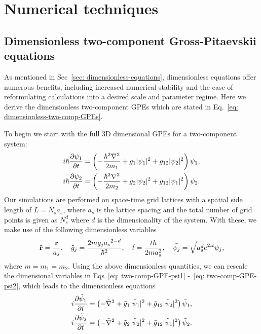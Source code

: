 \chapter{Numerical techniques}

\section{Dimensionless two-component Gross-Pitaevskii equations}
As mentioned in Sec~\ref{sec: dimensionless-equations}, dimensionless equations
offer numerous benefits, including increased numerical stability and the ease
of reformulating calculations into a desired scale and parameter regime.
Here we derive the dimensionless two-component GPEs which are stated in
Eq.~\eqref{eq: dimensionless-two-comp-GPEs}.

To begin we start with the full 3D dimensional GPEs for a two-component system:
\begin{align} \label{eq: two-comp-GPE-psi1}
    i\hbar\pdv{\psi_1}{t} &= \left(-\frac{\hbar^2\nabla^2}{2m_1} + g_1|\psi_1|^2
    +g_{12}|\psi_2|^2\right)\psi_1, \\
    i\hbar\pdv{\psi_2}{t} &= \left(-\frac{\hbar^2\nabla^2}{2m_2} + g_2|\psi_2|^2
    +g_{12}|\psi_1|^2\right)\psi_2. \label{eq: two-comp-GPE-psi2}
\end{align}
Our simulations are performed on space-time grid lattices with a spatial side
length of \(L = N_s a_s\), where \(a_s\) is the lattice spacing and the total
number of grid points is given as \(N_s^d\) where \(d\) is the dimensionality of
the system.
With these, we make use of the following dimensionless variables
\begin{align}
    \tilde{\vb{r}} = \frac{\vb{r}}{a_s}, \quad
    \tilde{g}_j = \frac{2mg_j{a_s}^{2-d}}{\hbar^2}, \quad
    \tilde{t} = \frac{t\hbar}{2ma_s^2}, \quad
    \tilde{\psi_j} = \sqrt{a_s^d}e^{2i\tilde{t}}\psi_j,
\end{align}
where \(m = m_1 = m_2\).
Using the above dimensionless quantities, we can rescale the dimensional
variables in Eqs~\eqref{eq: two-comp-GPE-psi1} -~\eqref{eq: two-comp-GPE-psi2},
which leads to the dimensionless equations
\begin{align}
    i\pdv{\tilde{\psi}_1}{t} &= \left(-\tilde{\nabla}^2
    + \tilde{g}_1|\tilde{\psi}_1|^2 + \tilde{g}_{12}|\tilde{\psi}_2|^2\right)
    \tilde{\psi}_1, \\
    i\pdv{\tilde{\psi}_2}{t} &= \left(-\tilde{\nabla}^2
    + \tilde{g}_2|\tilde{\psi}_2|^2 + \tilde{g}_{12}|\tilde{\psi}_1|^2\right)
    \tilde{\psi}_2.
\end{align}
